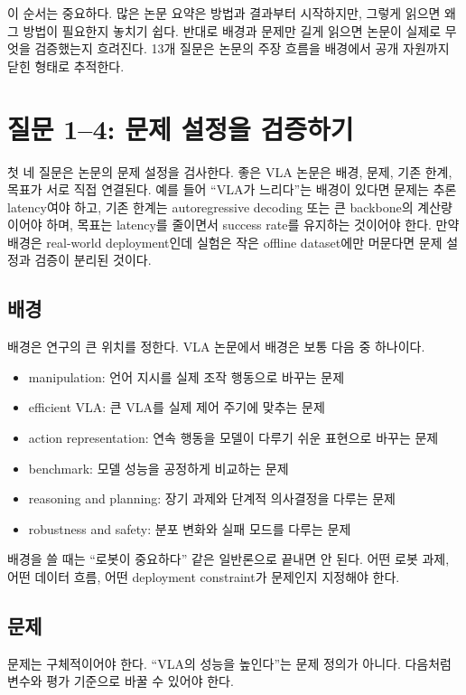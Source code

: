 이 순서는 중요하다. 많은 논문 요약은 방법과 결과부터 시작하지만, 그렇게 읽으면 왜 그 방법이 필요한지 놓치기 쉽다. 반대로 배경과 문제만 길게 읽으면 논문이 실제로 무엇을 검증했는지 흐려진다. 13개 질문은 논문의 주장 흐름을 배경에서 공개 자원까지 닫힌 형태로 추적한다.

\section{질문 1--4: 문제 설정을 검증하기}

첫 네 질문은 논문의 문제 설정을 검사한다. 좋은 VLA 논문은 배경, 문제, 기존 한계, 목표가 서로 직접 연결된다. 예를 들어 ``VLA가 느리다''는 배경이 있다면 문제는 추론 latency여야 하고, 기존 한계는 autoregressive decoding 또는 큰 backbone의 계산량이어야 하며, 목표는 latency를 줄이면서 success rate를 유지하는 것이어야 한다. 만약 배경은 real-world deployment인데 실험은 작은 offline dataset에만 머문다면 문제 설정과 검증이 분리된 것이다.

\subsection{배경}

배경은 연구의 큰 위치를 정한다. VLA 논문에서 배경은 보통 다음 중 하나이다.

\begin{itemize}
  \item manipulation: 언어 지시를 실제 조작 행동으로 바꾸는 문제
  \item efficient VLA: 큰 VLA를 실제 제어 주기에 맞추는 문제
  \item action representation: 연속 행동을 모델이 다루기 쉬운 표현으로 바꾸는 문제
  \item benchmark: 모델 성능을 공정하게 비교하는 문제
  \item reasoning and planning: 장기 과제와 단계적 의사결정을 다루는 문제
  \item robustness and safety: 분포 변화와 실패 모드를 다루는 문제
\end{itemize}

배경을 쓸 때는 ``로봇이 중요하다'' 같은 일반론으로 끝내면 안 된다. 어떤 로봇 과제, 어떤 데이터 흐름, 어떤 deployment constraint가 문제인지 지정해야 한다.

\subsection{문제}

문제는 구체적이어야 한다. ``VLA의 성능을 높인다''는 문제 정의가 아니다. 다음처럼 변수와 평가 기준으로 바꿀 수 있어야 한다.

